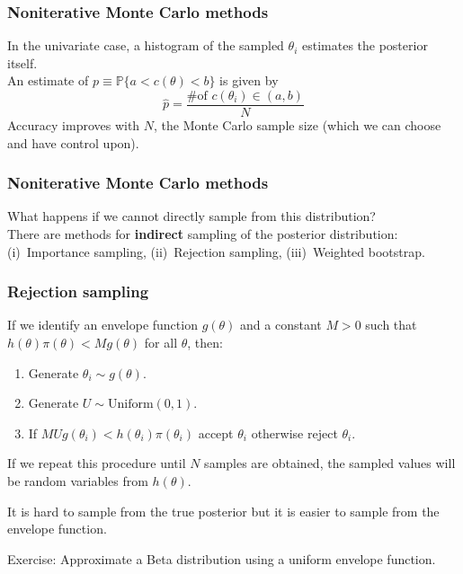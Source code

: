 \documentclass{beamer}
\renewcommand{\P}{\mathbb{P}}
\newcommand{\1}{\ensuremath{\mathbf{1}}}
\begin{document}
%
%
%
\begin{frame}\frametitle{Noniterative Monte Carlo methods}
	In the univariate case, a histogram of the sampled $\theta_i$ estimates the posterior itself.\\[1.5ex]
	An estimate of $p \equiv \P\{a < c(\theta) < b\}$ is given by
	\begin{equation}
		\hat{p} = \frac{\text{\# of $c(\theta_i) \in (a,b)$}}{N}
	\end{equation}
	Accuracy improves with $N$, the Monte Carlo sample size (which we can choose and have control upon).
\end{frame}
%
%
%
\begin{frame}\frametitle{Noniterative Monte Carlo methods}
	What happens if we cannot directly sample from this distribution?\\
	There are methods for \textbf{indirect} sampling of the posterior distribution: (i)~Importance sampling, (ii)~Rejection sampling, (iii)~Weighted bootstrap.
\end{frame}
%
%
%
\begin{frame}\frametitle{Rejection sampling}
	If we identify an envelope function $g(\theta)$ and a constant $M > 0$ such that $h(\theta)\pi(\theta) < Mg(\theta)$ for all $\theta$, then:
	\begin{enumerate}
		\item Generate $\theta_i \sim g(\theta)$.
		\item Generate $U \sim \text{Uniform}(0, 1)$.
		\item If $MUg(\theta_i) < h(\theta_i)\pi(\theta_i)$ accept $\theta_i$ otherwise reject $\theta_i$.
	\end{enumerate}
	If we repeat this procedure until $N$ samples are obtained, the sampled values will be random variables from $h(\theta)$.
	\begin{block}{}
		It is hard to sample from the true posterior but it is easier to sample from the envelope function.
	\end{block}
	Exercise: Approximate a Beta distribution using a uniform envelope function.
\end{frame}
\end{document}
